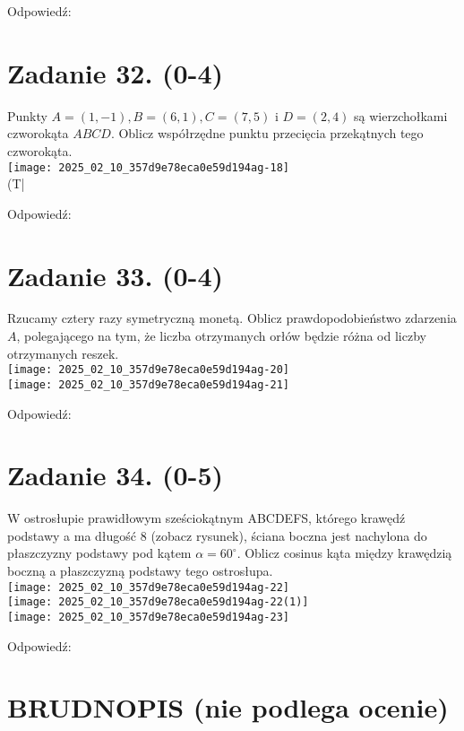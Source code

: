 \documentclass[10pt]{article}
\begin{document}
Odpowiedź:

\section*{Zadanie 32. (0-4)}
Punkty \(A=(1,-1), B=(6,1), C=(7,5)\) i \(D=(2,4)\) są wierzchołkami czworokąta \(A B C D\). Oblicz współrzędne punktu przecięcia przekątnych tego czworokąta.\\
\texttt{[image: 2025\_02\_10\_357d9e78eca0e59d194ag-18]}\\
(T|

Odpowiedź:

\section*{Zadanie 33. (0-4)}
Rzucamy cztery razy symetryczną monetą. Oblicz prawdopodobieństwo zdarzenia \(A\), polegającego na tym, że liczba otrzymanych orłów będzie różna od liczby otrzymanych reszek.\\
\texttt{[image: 2025\_02\_10\_357d9e78eca0e59d194ag-20]}\\
\texttt{[image: 2025\_02\_10\_357d9e78eca0e59d194ag-21]}

Odpowiedź:

\section*{Zadanie 34. (0-5)}
W ostrosłupie prawidłowym sześciokątnym ABCDEFS, którego krawędź podstawy a ma długość 8 (zobacz rysunek), ściana boczna jest nachylona do płaszczyzny podstawy pod kątem \(\alpha=60^{\circ}\). Oblicz cosinus kąta między krawędzią boczną a płaszczyzną podstawy tego ostrosłupa.\\
\texttt{[image: 2025\_02\_10\_357d9e78eca0e59d194ag-22]}\\
\texttt{[image: 2025\_02\_10\_357d9e78eca0e59d194ag-22(1)]}\\
\texttt{[image: 2025\_02\_10\_357d9e78eca0e59d194ag-23]}

Odpowiedź:

\section*{BRUDNOPIS (nie podlega ocenie)}
\end{document}
